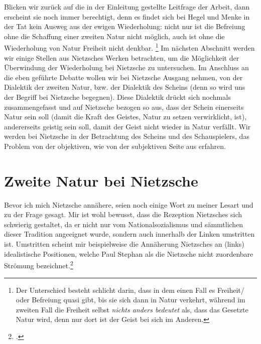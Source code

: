 \documentclass[12pt, a4paper, openany]{report}
\begin{document}
Blicken wir zurück auf die in der Einleitung gestellte Leitfrage der Arbeit, dann erscheint sie noch immer berechtigt, denn es findet sich bei Hegel und Menke in der Tat kein Ausweg aus der ewigen Wiederholung:
nicht nur ist die Befreiung ohne die Schaffung einer zweiten Natur nicht möglich, auch ist ohne die Wiederholung von Natur Freiheit nicht denkbar.%
\footnote{
    Der Unterschied besteht schlicht darin, dass in dem einen Fall es Freiheit/ oder Befreiung quasi  gibt, bis sie sich dann in Natur verkehrt, während im zweiten Fall die Freiheit selbst \emph{nichts anders bedeutet} als, dass das Gesetzte Natur wird, denn nur dort ist der Geist bei sich im Anderen.
}
Im nächsten Abschnitt werden wir einige Stellen aus Nietzsches Werken betrachten, um die Möglichkeit der Überwindung der Wiederholung bei Nietzsche zu untersuchen.
Im Anschluss an die eben geführte Debatte wollen wir bei Nietzsche Ausgang nehmen, von der Dialektik der zweiten Natur, bzw. der Dialektik des Scheins (denn so wird uns der Begriff bei Nietzsche begegnen).
Diese Dialektik drückt sich nochmals zusammengefasst und auf Nietzsche bezogen so aus, dass der Schein einerseits Natur sein soll (damit die Kraft des Geistes, Natur zu setzen verwirklicht, ist), andererseits geistig sein soll, damit der Geist nicht wieder in Natur verfällt. 
Wir werden bei Nietzsche in der Betrachtung des Scheins und des Schauspielers, das Problem von der objektiven, wie von der subjektiven Seite aus erfahren. 

\section{Zweite Natur bei Nietzsche}\label{abschnitt_2}
Bevor ich mich Nietzsche annähere, seien noch einige Wort zu meiner Lesart und zu der Frage  gesagt.
Mir ist wohl bewusst, dass die Rezeption Nietzsches sich schwierig gestaltet, da er nicht nur vom Nationalsozialismus und sämmtlichen  dieser Tradition angeeignet wurde, sondern auch innerhalb der Linken umstritten ist.
Umstritten scheint mir beispielweise die Annäherung Nietzsches an (links) idealistische Positionen, welche Paul Stephan als die Nietzsche nicht zuordenbare Strömung bezeichnet.\footcite[Vgl.][26]{stephan_nietzscheanismus_2019}
\end{document}
